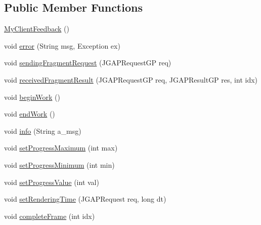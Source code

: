 \subsection*{Public Member Functions}
\begin{DoxyCompactItemize}
\item 
\hyperlink{classexamples_1_1grid_1_1math_problem_distributed_1_1_my_client_feedback_a3e7ac224237da7a12f47cb5679b9204a}{My\-Client\-Feedback} ()
\item 
void \hyperlink{classexamples_1_1grid_1_1math_problem_distributed_1_1_my_client_feedback_aed6fafd9a18ae9c593c9abfa76ff29df}{error} (String msg, Exception ex)
\item 
void \hyperlink{classexamples_1_1grid_1_1math_problem_distributed_1_1_my_client_feedback_a3a4f4f802197b6604b6b62b8932f8fc2}{sending\-Fragment\-Request} (J\-G\-A\-P\-Request\-G\-P req)
\item 
void \hyperlink{classexamples_1_1grid_1_1math_problem_distributed_1_1_my_client_feedback_a370ba38993c31c0650ab34c512cb43ec}{received\-Fragment\-Result} (J\-G\-A\-P\-Request\-G\-P req, J\-G\-A\-P\-Result\-G\-P res, int idx)
\item 
void \hyperlink{classexamples_1_1grid_1_1math_problem_distributed_1_1_my_client_feedback_a156e8f2d5190535199090e427a6f2977}{begin\-Work} ()
\item 
void \hyperlink{classexamples_1_1grid_1_1math_problem_distributed_1_1_my_client_feedback_acdbbfa08dec1ec3a253d2d0cf4662cd9}{end\-Work} ()
\item 
void \hyperlink{classexamples_1_1grid_1_1math_problem_distributed_1_1_my_client_feedback_ae69c7465e2304d585ffb36559fbeda52}{info} (String a\-\_\-msg)
\item 
void \hyperlink{classexamples_1_1grid_1_1math_problem_distributed_1_1_my_client_feedback_af94e77ddad94cee932b3943e04a44ac4}{set\-Progress\-Maximum} (int max)
\item 
void \hyperlink{classexamples_1_1grid_1_1math_problem_distributed_1_1_my_client_feedback_a8a82292e0772568fce99327899777969}{set\-Progress\-Minimum} (int min)
\item 
void \hyperlink{classexamples_1_1grid_1_1math_problem_distributed_1_1_my_client_feedback_a52713a4777ab4207395e01fe2566d848}{set\-Progress\-Value} (int val)
\item 
void \hyperlink{classexamples_1_1grid_1_1math_problem_distributed_1_1_my_client_feedback_ae4a1ddae8a231e70ff373ce6d75c3439}{set\-Rendering\-Time} (J\-G\-A\-P\-Request req, long dt)
\item 
void \hyperlink{classexamples_1_1grid_1_1math_problem_distributed_1_1_my_client_feedback_a617b6740bda7437e4b8df2cfdada217f}{complete\-Frame} (int idx)
\end{DoxyCompactItemize}
